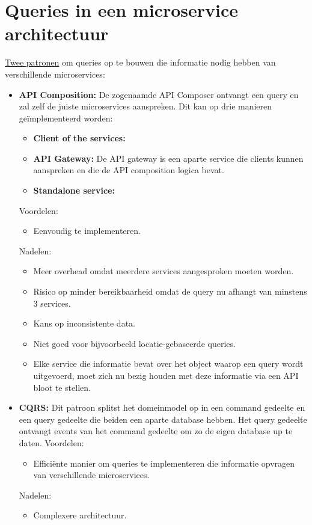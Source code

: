 	\chapter{Queries in een microservice architectuur}
	\underline{Twee patronen} om queries op te bouwen die informatie nodig hebben van verschillende microservices:
	\begin{itemize}
		\item \textbf{API Composition:} De zogenaamde API Composer ontvangt een query en zal zelf de juiste microservices aanspreken. Dit kan op drie manieren geïmplementeerd worden:
		\begin{itemize}
			\item \textbf{Client of the services:} 
			\item \textbf{API Gateway:} De API gateway is een aparte service die clients kunnen aanspreken en die de API composition logica bevat. 
			\item \textbf{Standalone service:} 
		\end{itemize}
		Voordelen:
		\begin{itemize}
			\item[\good] Eenvoudig te implementeren.
		\end{itemize}
		Nadelen:
		\begin{itemize}
			\item[\alert] Meer overhead omdat meerdere services aangesproken moeten worden.
			\item[\alert] Risico op minder bereikbaarheid omdat de query nu afhangt van minstens 3 services.
			\item[\alert] Kans op inconsistente data.
			\item[\alert] Niet goed voor bijvoorbeeld locatie-gebaseerde queries.
			\item[\alert] Elke service die informatie bevat over het object waarop een query wordt uitgevoerd, moet zich nu bezig houden met deze informatie via een API bloot te stellen.
		\end{itemize}
		\item \textbf{CQRS:} Dit patroon splitst het domeinmodel op in een command gedeelte en een query gedeelte die beiden een aparte database hebben. Het query gedeelte ontvangt events van het command gedeelte om zo de eigen database up te daten. 
		Voordelen:
		\begin{itemize}
			\item[\good] Efficiënte manier om queries te implementeren die informatie opvragen van verschillende microservices.
		\end{itemize}
		Nadelen:
		\begin{itemize}
			\item[\alert] Complexere architectuur.
		
		\end{itemize}
	\end{itemize}

	